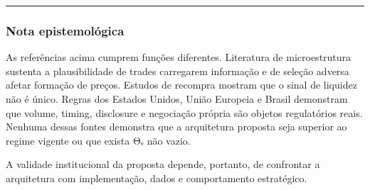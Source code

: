 \documentclass[
  a4paper,
]{article}
\begin{document}
\begin{center}\rule{0.5\linewidth}{0.5pt}\end{center}

\hypertarget{nota-epistemoluxf3gica}{%
\subsubsection{Nota epistemológica}\label{nota-epistemoluxf3gica}}

As referências acima cumprem funções diferentes. Literatura de
microestrutura sustenta a plausibilidade de trades carregarem informação
e de seleção adversa afetar formação de preços. Estudos de recompra
mostram que o sinal de liquidez não é único. Regras dos Estados Unidos,
União Europeia e Brasil demonstram que volume, timing, disclosure e
negociação própria são objetos regulatórios reais. Nenhuma dessas fontes
demonstra que a arquitetura proposta seja superior ao regime vigente ou
que exista Θᵥ não vazio.

A validade institucional da proposta depende, portanto, de confrontar a
arquitetura com implementação, dados e comportamento estratégico.
\end{document}

